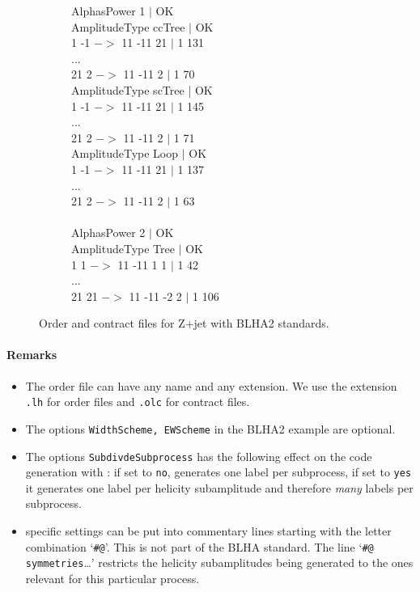 \begin{figure}[h]
\begin{subfigure}[]{0.49\textwidth}
{{AlphasPower 1 $|$ OK\\
AmplitudeType ccTree $|$ OK\\
1 -1 $->$ 11 -11 21 $|$ 1 131\\
...\\
21 2 $->$ 11 -11 2 $|$ 1 70\\
AmplitudeType scTree | OK\\
1 -1 $->$ 11 -11 21 $|$ 1 145\\
...\\
21 2 $->$ 11 -11 2 $|$ 1 71\\
AmplitudeType Loop $|$ OK\\
1 -1 $->$ 11 -11 21 $|$ 1 137\\
...\\
21 2 $->$ 11 -11 2 $|$ 1 63\\
\\
AlphasPower 2 $|$ OK\\
AmplitudeType Tree $|$ OK\\
1 1 $->$ 11 -11 1 1 $|$ 1 42\\
...\\
21 21 $->$ 11 -11 -2 2 $|$ 1 106\\}
}
\end{subfigure}
\caption{Order and contract files for Z+jet with BLHA2 standards.}
\label{fig:BLHA2}
\end{figure}  

\paragraph{Remarks}
\begin{itemize}
\item The order file can have any name and any extension.
      We use  the extension \texttt{.lh}
      for order files and \texttt{.olc} for contract files.
\item The options \texttt{WidthScheme, EWScheme} in the BLHA2  example are optional.
\item The options \texttt{SubdivdeSubprocess}  has the following effect
      on the code generation with \gosam{}: if set to 
      \texttt{no}, \gosam{} generates one label per subprocess, if set to
      \texttt{yes} it generates one label per helicity subamplitude
      and therefore \emph{many} labels per subprocess.
      
\item \gosam{} specific settings can be put into commentary lines starting
      with the letter combination `\texttt{\#@}'. This is not part of the
      BLHA standard. The line `\texttt{\#@ symmetries}\dots' restricts the
      helicity subamplitudes being generated to the ones relevant for this
      particular process. 
\end{itemize}

